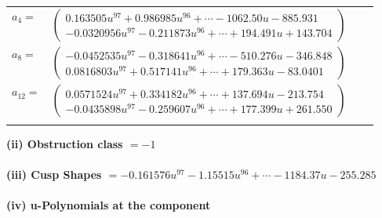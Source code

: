 \documentclass[1p]{elsarticle_modified}
\theoremstyle{definition}
\begin{document}
\begin{tabular}{m{7pt} m{180pt} m{7pt} m{180pt} }
\flushright $a_{4}=$&$\begin{pmatrix}0.163505 u^{97}+0.986985 u^{96}+\cdots-1062.50 u-885.931\\-0.0320956 u^{97}-0.211873 u^{96}+\cdots+194.491 u+143.704\end{pmatrix}$ \\
\flushright $a_{8}=$&$\begin{pmatrix}-0.0452535 u^{97}-0.318641 u^{96}+\cdots-510.276 u-346.848\\0.0816803 u^{97}+0.517141 u^{96}+\cdots+179.363 u-83.0401\end{pmatrix}$ \\
\flushright $a_{12}=$&$\begin{pmatrix}0.0571524 u^{97}+0.334182 u^{96}+\cdots+137.694 u-213.754\\-0.0435898 u^{97}-0.259607 u^{96}+\cdots+177.399 u+261.550\end{pmatrix}$\\&\end{tabular}
\flushleft \textbf{(ii) Obstruction class $= -1$}\\~\\
\flushleft \textbf{(iii) Cusp Shapes $= -0.161576 u^{97}-1.15515 u^{96}+\cdots-1184.37 u-255.285$}\\~\\
\newpage\renewcommand{\arraystretch}{1}
\flushleft \textbf{(iv) u-Polynomials at the component}\newline \\
\end{document}
